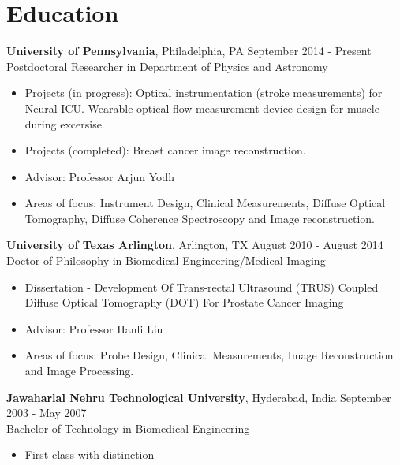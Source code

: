 \documentclass{my_cv}
\begin{document}

\section{Education}
\begin{flushleft}  
\textbf{University of Pennsylvania}, Philadelphia, PA  \hfill September 2014 - Present \\ 
Postdoctoral Researcher in Department of Physics and Astronomy \\ 
\vspace{-3mm}
\begin{itemize}\itemsep -2pt
\item Projects (in progress): Optical instrumentation (stroke measurements) for Neural ICU. Wearable optical flow measurement device design for muscle during excersise.  
\item Projects (completed): Breast cancer image reconstruction. 
\item Advisor: Professor Arjun Yodh
\item Areas of focus: Instrument Design, Clinical Measurements, Diffuse Optical Tomography, Diffuse Coherence Spectroscopy and Image reconstruction.
\end{itemize}


\textbf{University of Texas Arlington}, Arlington, TX \hfill August 2010 - August 2014 \\ 
Doctor of Philosophy in Biomedical Engineering/Medical Imaging \\
\vspace{-3mm}
\begin{itemize}\itemsep -2pt
\item Dissertation -  Development Of Trans-rectal Ultrasound (TRUS) Coupled Diffuse Optical Tomography (DOT) For Prostate Cancer Imaging
\item Advisor: Professor Hanli Liu 
\item Areas of focus: Probe Design, Clinical Measurements, Image Reconstruction and Image Processing.
\end{itemize}
 
\textbf{Jawaharlal Nehru Technological University}, Hyderabad, India \hfill September 2003 - May 2007\\
Bachelor of Technology in Biomedical Engineering \\ 
\vspace{-3mm}
\begin{itemize}
\setlength\itemsep{0em} 
\item First class with distinction
\end{itemize}
\end{flushleft}  
 
\end{document}
